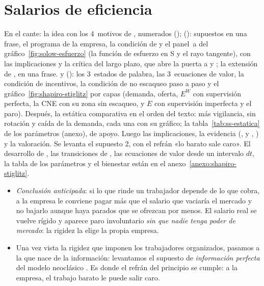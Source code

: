 \documentclass[11pt]{article}
\begin{document}
\section{Salarios de eficiencia}\label{sec:eficiencia}

\begin{notaopositor}
En el cante: la idea con los 4~motivos de , numerados ();  (): supuestos en una frase, el programa de la empresa, la condición de  y el panel~a del gráfico~\ref{fig:solow-esfuerzo} (la función de esfuerzo en S y el rayo tangente), con las implicaciones y la crítica del largo plazo, que abre la puerta a  y ; la extensión de , en una frase.  y  (): los 3~estados de palabra, las 3~ecuaciones de valor, la condición de incentivos, la condición de no escaqueo paso a paso y el gráfico~\ref{fig:shapiro-stiglitz} por capas (demanda, oferta, $E^W$ con supervisión perfecta, la CNE con su zona sin escaqueo, y $E$ con supervisión imperfecta y el paro). Después, la estática comparativa en el orden del texto: más vigilancia, sin rotación y caída de la demanda, cada una con su gráfico; la tabla~\ref{tab:ss-estatica} de los parámetros (anexo), de apoyo. Luego las implicaciones, la evidencia (,  y , ) y la valoración. Se levanta el supuesto 2, con el refrán «lo barato sale caro». El desarrollo de , las transiciones de , las ecuaciones de valor desde un intervalo $dt$, la tabla de los parámetros y el bienestar están en el anexo~\ref{anexo:shapiro-stiglitz}.
\end{notaopositor}

\begin{itemize}
\item \emph{Conclusión anticipada}: si lo que rinde un trabajador depende de lo que cobra, a la empresa le conviene pagar más que el salario que vaciaría el mercado y no bajarlo aunque haya parados que se ofrezcan por menos. El salario real se vuelve rígido y aparece paro involuntario \emph{sin que nadie tenga poder de mercado}: la rigidez la elige la propia empresa.
\item Una vez vista la rigidez que imponen los trabajadores organizados, pasamos a la que nace de la información: levantamos el supuesto de \emph{información perfecta} del modelo neoclásico . Es donde el refrán del principio se cumple: a la empresa, el trabajo barato le puede salir caro.
\end{itemize}
\end{document}
